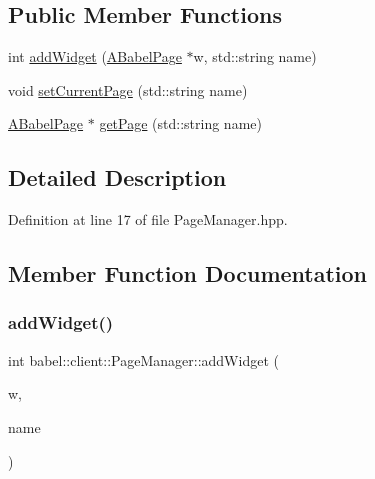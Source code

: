 \subsection*{Public Member Functions}
\begin{DoxyCompactItemize}
\item 
int \mbox{\hyperlink{classbabel_1_1client_1_1_page_manager_aa12f5f0233b79a29c8d6ea0d540396a0}{add\+Widget}} (\mbox{\hyperlink{classbabel_1_1client_1_1_a_babel_page}{A\+Babel\+Page}} $\ast$w, std\+::string name)
\item 
void \mbox{\hyperlink{classbabel_1_1client_1_1_page_manager_a49153c52aa0387dbf05c16e2032a4c7d}{set\+Current\+Page}} (std\+::string name)
\item 
\mbox{\hyperlink{classbabel_1_1client_1_1_a_babel_page}{A\+Babel\+Page}} $\ast$ \mbox{\hyperlink{classbabel_1_1client_1_1_page_manager_a1a9343498814bdd5e07034fd7449c58e}{get\+Page}} (std\+::string name)
\end{DoxyCompactItemize}


\subsection{Detailed Description}


Definition at line 17 of file Page\+Manager.\+hpp.



\subsection{Member Function Documentation}
\mbox{\label{classbabel_1_1client_1_1_page_manager_aa12f5f0233b79a29c8d6ea0d540396a0}} 
\subsubsection{\texorpdfstring{add\+Widget()}{addWidget()}}
{\footnotesize\ttfamily int babel\+::client\+::\+Page\+Manager\+::add\+Widget (\begin{DoxyParamCaption}\item[{\mbox{\hyperlink{classbabel_1_1client_1_1_a_babel_page}{A\+Babel\+Page}} $\ast$}]{w,  }\item[{std\+::string}]{name }\end{DoxyParamCaption})}



